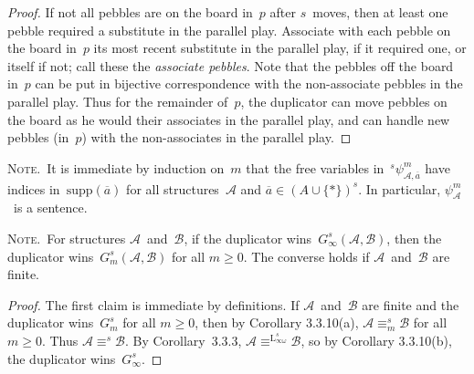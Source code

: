 \documentclass[letterpaper]{article}
\newcommand{\A}{\mathcal{A}}
\newcommand{\B}{\mathcal{B}}
\renewcommand{\L}{\mathrm{L}}
\newcommand{\Lio}{\L_{\infty\omega}}
\newcommand{\obar}[1]{\overline{#1}}
\newcommand{\supp}{\mathrm{supp}}
\newcommand{\union}{\cup}
\newcommand{\note}{\noindent\textsc{Note.}\ }
\theoremstyle{plain}
\begin{document}
\begin{enumerate}
\begin{proof}
If not all pebbles are on the board in~$p$ after $s$~moves, then at least one pebble required a substitute in the parallel play. Associate with each pebble on the board in~$p$ its most recent substitute in the parallel play, if it required one, or itself if not; call these the \emph{associate pebbles}. Note that the pebbles off the board in~$p$ can be put in bijective correspondence with the non-associate pebbles in the parallel play. Thus for the remainder of~$p$, the duplicator can move pebbles on the board as he would their associates in the parallel play, and can handle new pebbles (in~$p$) with the non-associates in the parallel play.
\end{proof}
\end{enumerate}

\note It is immediate by induction on~$m$ that the free variables in~${}^s\psi_{\A,\obar{a}}^m$ have indices in~$\supp(\obar{a})$ for all structures~$\A$ and $\obar{a}\in(A\union\{*\})^s$. In particular, $\psi_{\A}^m$~is a sentence.

\bigskip
\note For structures $\A$~and~$\B$, if the duplicator wins~$G_{\infty}^s(\A,\B)$, then the duplicator wins~$G_m^s(\A,\B)$ for all $m\ge0$. The converse holds if $\A$~and~$\B$ are finite.
\begin{proof}
The first claim is immediate by definitions. If $\A$~and~$\B$ are finite and the duplicator wins~$G_m^s$ for all $m\ge0$, then by Corollary 3.3.10(a), $\A\equiv_m^s\B$ for all $m\ge0$. Thus $\A\equiv^s\B$. By Corollary~3.3.3, $\A\equiv^{\Lio^s}\B$, so by Corollary 3.3.10(b), the duplicator wins~$G_{\infty}^s$.
\end{proof}
\end{document}
